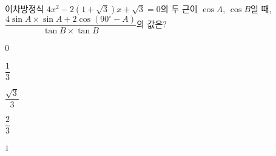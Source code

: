 이차방정식 $4x^2-2(1+\sqrt{3})x+\sqrt{3}=0$의 두 근이 $\cos A$, $\cos B$일 때, $\dfrac{4\sin A\times\sin A+2\cos(90^\circ-A)}{\tan B\times\tan B}$의 값은? 
\begin{choices32}{\rule[-3ex]{0pt}{8ex}$0$}{\rule[-3ex]{0pt}{8ex}$\dfrac{1}{3}$}{\rule[-3ex]{0pt}{8ex}$\dfrac{\sqrt{3}}{3}$}{\rule[-3ex]{0pt}{8ex}$\dfrac{2}{3}$}{\rule[-3ex]{0pt}{8ex}$1$}\end{choices32}
